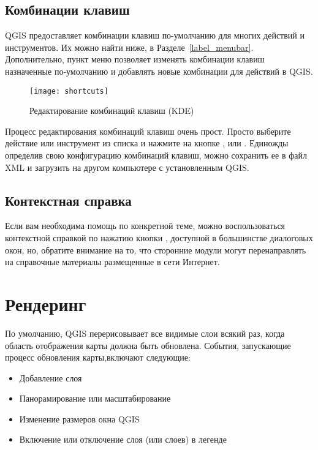 \subsection{Комбинации клавиш}\label{shortcuts}

QGIS предоставляет комбинации клавиш по-умолчанию для многих действий и
инструментов. Их можно найти ниже, в Разделе~\ref{label_menubar}.
Дополнительно, пункт меню  \arrow
{} позволяет изменять комбинации клавиш
назначенные по-умолчанию и добавлять новые комбинации для действий в QGIS.

\begin{figure}[ht]
   \centering
   \texttt{[image: shortcuts]}
   \caption{Редактирование комбинаций клавиш \nixcaption (KDE)} \label{fig:shortcuts}
\end{figure}

Процесс редактирования комбинаций клавиш очень прост. Просто выберите
действие или инструмент из списка и нажмите на кнопке ,
 или . Единожды определив свою
конфигурацию комбинаций клавиш, можно сохранить ее в файл XML и загрузить
на другом компьютере с установленным QGIS.

\subsection{Контекстная справка}\label{context_help}

Если вам необходима помощь по конкретной теме, можно воспользоваться
контекстной справкой по нажатию кнопки , доступной в
большинстве диалоговых окон, но, обратите внимание на то, что сторонние
модули могут перенаправлять на справочные материалы размещенные в сети
Интернет.

\section{Рендеринг}\label{subsec:redraw_events}

По умолчанию, QGIS перерисовывает все видимые слои всякий раз, когда
область отображения карты должна быть обновлена. События, запускающие
процесс обновления карты,включают следующие:

\begin{itemize}
\item Добавление слоя
\item Панорамирование или масштабирование
\item Изменение размеров окна QGIS
\item Включение или отключение слоя (или слоев) в легенде
\end{itemize}


